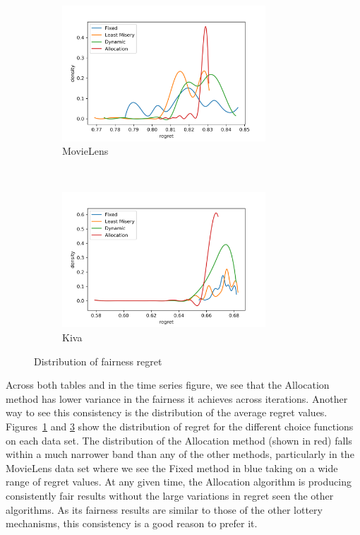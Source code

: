 \begin{figure}[t!]
    \centering
    \begin{subfigure}[t]{0.5\textwidth}
        \centering
        \includegraphics[width=3.0in]{imgs/dynfair/ML_regret_variance_sep20.png}
        \caption{MovieLens}
        \label{fig:local-regret-ML}
    \end{subfigure}%
    ~ 
    \begin{subfigure}[t]{0.5\textwidth}
        \centering
        \includegraphics[width=3.0in]{imgs/dynfair/kiva_regret_variance_sep20.png}
        \caption{Kiva}
        \label{fig:local-regret-Kiva}
    \end{subfigure}
    \caption{Distribution of fairness regret}
\end{figure}

Across both tables and in the time series figure, we see that the Allocation method has  lower variance in the fairness it achieves across iterations. Another way to see this consistency is the distribution of the average regret values. Figures~\ref{fig:local-regret-ML} and \ref{fig:local-regret-Kiva} show the distribution of regret for the different choice functions on each data set. The distribution of the Allocation method (shown in red) falls within a much narrower band than any of the other methods, particularly in the MovieLens data set where we see the Fixed method in blue taking on a wide range of regret values. At any given time, the Allocation algorithm is producing consistently fair results without the large variations in regret seen the other algorithms. As its fairness results are similar to those of the other lottery mechanisms, this consistency is a good reason to prefer it.

